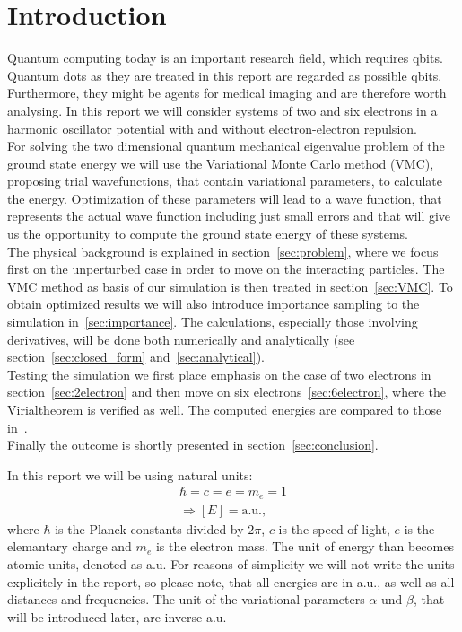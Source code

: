 \section{Introduction}
Quantum computing today is an important research field, which requires qbits. Quantum dots as they are treated in this report are regarded as possible qbits. Furthermore, they might be agents for medical imaging and are therefore worth analysing. In this report we will consider systems of two and six electrons in a harmonic oscillator potential with and without electron-electron repulsion.\\
For solving the two dimensional quantum mechanical eigenvalue problem of the ground state energy we will use the Variational Monte Carlo method (VMC), proposing trial wavefunctions, that contain variational parameters, to calculate the energy. Optimization of these parameters will lead to a wave function, that represents the actual wave function including just small errors and that will give us the opportunity to compute the ground state energy of these systems.\\
The physical background is explained in section~\ref{sec:problem}, where we focus first on the unperturbed case in order to move on the interacting particles. The VMC method as basis of our simulation is then treated in section~\ref{sec:VMC}. To obtain optimized results we will also introduce importance sampling to the simulation in~\ref{sec:importance}. The calculations, especially those involving derivatives, will be done both numerically and analytically (see section~\ref{sec:closed_form} and~\ref{sec:analytical}).\\
Testing the simulation we first place emphasis on the case of two electrons in section~\ref{sec:2electron} and then move on six electrons~\ref{sec:6electron}, where the Virialtheorem is verified as well. The computed energies are compared to those in~\cite{hogberget2013}.\\
Finally the outcome is shortly presented in section~\ref{sec:conclusion}.\\ \bigskip

In this report we will be using natural units:
\begin{align*}
\hbar = c = e = m_e = 1\\
\Rightarrow [E] = \mathrm{a.u.},
\end{align*}
where $\hbar$ is the Planck constants divided by $2\pi$, $c$ is the speed of light, $e$ is the elemantary charge and $m_e$ is the electron mass. The unit of energy than becomes atomic units, denoted as a.u. For reasons of simplicity we will not write the units explicitely in the report, so please note, that all energies are in a.u., as well as all distances and frequencies. The unit of the variational parameters $\alpha$ und $\beta$, that will be introduced later, are inverse a.u.